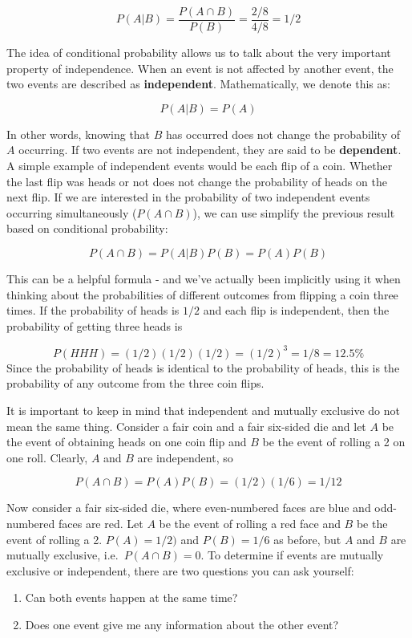 \documentclass[
]{book}
\providecommand{\tightlist}{%
  \setlength{\itemsep}{0pt}\setlength{\parskip}{0pt}}
\theoremstyle{definition}
\theoremstyle{definition}
\theoremstyle{definition}
\theoremstyle{remark}
\begin{document}
\[P(A|B) = \dfrac{P(A \cap B)}{P(B)} = \dfrac{2/8}{4/8} = 1/2\]

The idea of conditional probability allows us to talk about the very important property of independence. When an event is not affected by another event, the two events are described as \textbf{independent}. Mathematically, we denote this as:

\[P(A|B) = P(A)\]

In other words, knowing that \(B\) has occurred does not change the probability of \(A\) occurring. If two events are not independent, they are said to be \textbf{dependent}. A simple example of independent events would be each flip of a coin. Whether the last flip was heads or not does not change the probability of heads on the next flip. If we are interested in the probability of two independent events occurring simultaneously (\(P(A \cap B)\)), we can use simplify the previous result based on conditional probability:

\[P(A \cap B) = P(A|B) P(B) = P(A)P(B)\]

This can be a helpful formula - and we've actually been implicitly using it when thinking about the probabilities of different outcomes from flipping a coin three times. If the probability of heads is \(1/2\) and each flip is independent, then the probability of getting three heads is

\[P(HHH) = (1/2)(1/2)(1/2) = (1/2)^3 = 1/8 = 12.5\%\]
Since the probability of heads is identical to the probability of heads, this is the probability of any outcome from the three coin flips.

It is important to keep in mind that independent and mutually exclusive do not mean the same thing. Consider a fair coin and a fair six-sided die and let \(A\) be the event of obtaining heads on one coin flip and \(B\) be the event of rolling a 2 on one roll. Clearly, \(A\) and \(B\) are independent, so

\[P(A \cap B) = P(A)P(B) = (1/2)(1/6) = 1/12\]

Now consider a fair six-sided die, where even-numbered faces are blue and odd-numbered faces are red. Let \(A\) be the event of rolling a red face and \(B\) be the event of rolling a 2. \(P(A) = 1/2)\) and \(P(B) = 1/6\) as before, but \(A\) and \(B\) are mutually exclusive, i.e.~\(P(A \cap B) = 0\). To determine if events are mutually exclusive or independent, there are two questions you can ask yourself:

\begin{enumerate}
\def\labelenumi{\arabic{enumi})}
\tightlist
\item
  Can both events happen at the same time?
\item
  Does one event give me any information about the other event?
\end{enumerate}
\end{document}
